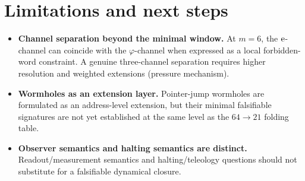 
\section{Limitations and next steps}
\label{app:limitations}

\begin{itemize}
\item \textbf{Channel separation beyond the minimal window.}
At $m=6$, the $\mathrm{e}$-channel can coincide with the $\varphi$-channel when expressed as a local forbidden-word constraint.
A genuine three-channel separation requires higher resolution and weighted extensions (pressure mechanism).
\item \textbf{Wormholes as an extension layer.}
Pointer-jump wormholes are formulated as an address-level extension, but their minimal falsifiable signatures are not yet established at the same level as the $64\to 21$ folding table.
\item \textbf{Observer semantics and halting semantics are distinct.}
Readout/measurement semantics and halting/teleology questions should not substitute for a falsifiable dynamical closure.
\end{itemize}



